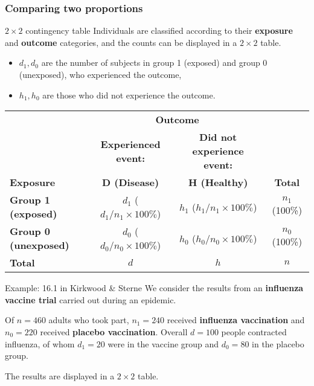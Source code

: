 \documentclass[compress, notes=hide]{beamer}
\newcommand{\hl}[1]{\textbf{#1}}
\begin{document}
\begin{frame}
	\frametitle{Comparing two proportions} 
	\begin{block}{$2 \times 2$ contingency table}
		Individuals are classified according to their\textbf{ exposure} and \textbf{outcome }categories, and the counts can be displayed in a $2 \times 2$ table.
		
		\begin{itemize}
			\item $d_1, d_0$ are the number of subjects in group 1 (exposed) and group 0 (unexposed), who experienced the outcome, 
			\item $h_1, h_0$ are those who did not experience the outcome.
		\end{itemize}	
	
				\begin{table}
			\begin{tiny}
				\begin{tabular}{lccc}
					\hline
					& \multicolumn{2}{c}{\textbf{Outcome}} &
					\\
					\cline{2-3}
					& \textbf{Experienced event:} & \textbf{Did not experience event:} &
					\\
					\textbf{Exposure} & \textbf{D (Disease)} & \textbf{H (Healthy)} & \textbf{Total}
					\\
					\hline
					\textbf{Group 1 (exposed)} & $d_1$ ($d_1/n_1 \times 100\%$) & $h_1$ ($h_1/n_1 \times 100\%$) & $n_1$ (100\%)
					\\
					\textbf{Group 0 (unexposed)} & $d_0$ ($d_0/n_0 \times 100\%$) & $h_0$ ($h_0/n_0 \times 100\%$) & $n_0$ (100\%)
					\\
					\hline
					\textbf{Total} & $d$ & $h$ & $n$
					\\
					\hline
				\end{tabular}
			\end{tiny}
		\end{table}
		
	\end{block}
\end{frame}




\begin{frame}
\begin{block}{Example: 16.1 in Kirkwood \& Sterne}
  We consider the results from an \hl{influenza vaccine trial}
  carried out during an epidemic. 

	\vspace{0.2cm}
	
  Of $n=460$ adults who took part, $n_1=240$ received \hl{influenza
    vaccination} and $n_0=220$ received \hl{placebo
    vaccination}. Overall $d=100$ people contracted influenza, of whom
  $d_1=20$ were in the vaccine group and $d_0=80$ in the placebo
  group. 

The results are displayed in a $2 \times 2$ table.
\end{block}
\end{frame}
\end{document}

